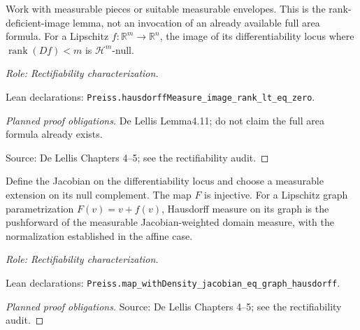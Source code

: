\begin{lemma}
\label{lem:rank-deficient-image-null}







Work with measurable pieces or suitable measurable envelopes. This is the rank-deficient-image lemma, not an invocation of an already available full area formula.
For a Lipschitz \(f:\mathbb R^m\to\mathbb R^n\), the image of its differentiability locus where \(\operatorname{rank}(Df)<m\) is \(\mathcal H^m\)-null.
\par\emph{Role: Rectifiability characterization.}
\par Lean declarations: \texttt{Preiss.hausdorffMeasure\_image\_rank\_lt\_eq\_zero}.
\end{lemma}
\begin{proof}[Planned proof obligations]

De Lellis Lemma4.11; do not claim the full area formula already exists.
\par Source: De Lellis Chapters 4--5; see the rectifiability audit.
\end{proof}

\begin{lemma}
\label{lem:graph-area}








Define the Jacobian on the differentiability locus and choose a measurable extension on its null complement. The map \(F\) is injective.
For a Lipschitz graph parametrization \(F(v)=v+f(v)\), Hausdorff measure on its graph is the pushforward of the measurable Jacobian-weighted domain measure, with the normalization established in the affine case.
\par\emph{Role: Rectifiability characterization.}
\par Lean declarations: \texttt{Preiss.map\_withDensity\_jacobian\_eq\_graph\_hausdorff}.
\end{lemma}
\begin{proof}[Planned proof obligations]

\par Source: De Lellis Chapters 4--5; see the rectifiability audit.
\end{proof}

